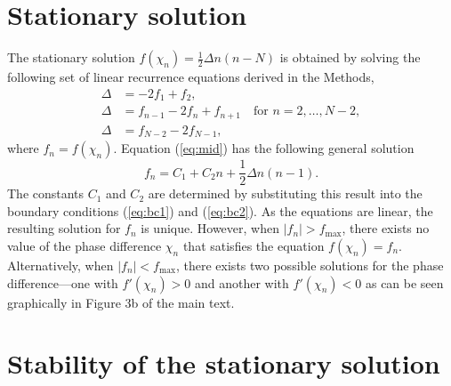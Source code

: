 \begin{appendices}
\clearpage
\section{Stationary solution}

The stationary solution $f(\chi_n)=\tfrac{1}{2}\Delta n(n-N)$ is obtained by solving the following set of linear recurrence equations derived in the Methods,
\begin{align}
    \Delta &= -2 f_1 + f_2 , \label{eq:bc1}
    \\
    \Delta &= f_{n-1} - 2 f_n + f_{n+1} \quad \text{for } n=2,\dots,N-2, \label{eq:mid}
    \\
    \Delta &= f_{N-2} - 2 f_{N-1}, \label{eq:bc2}
\end{align}
where $f_n=f(\chi_n)$.  Equation (\ref{eq:mid}) has the following general solution
\begin{equation}
    f_n = C_1 + C_2 n + \frac{1}{2}\Delta n(n-1).
\end{equation}
The constants $C_1$ and $C_2$ are determined by substituting this result into the boundary conditions (\ref{eq:bc1}) and (\ref{eq:bc2}).  As the equations are linear, the resulting solution for $f_n$ is unique. However, when $|f_n| > f_{\max}$, there exists no value of the phase difference $\chi_n$ that satisfies the equation $f(\chi_n)=f_n$.  Alternatively, when $|f_n|<f_{\max}$, there exists two possible solutions for the phase difference---one with $f'(\chi_n)>0$ and another with $f'(\chi_n)<0$ as can be seen graphically in Figure 3b of the main text.

\section{Stability of the stationary solution}


\end{appendices}
